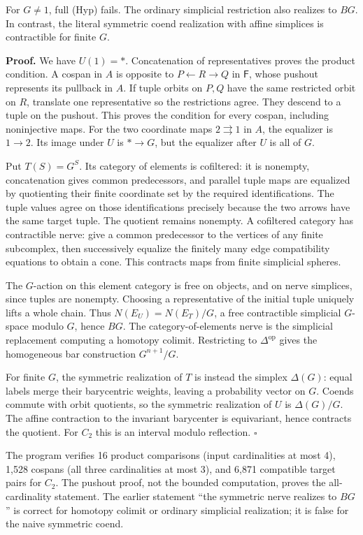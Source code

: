 For \(G\ne1\), full (Hyp) fails. The ordinary simplicial restriction
also realizes to \(BG\). In contrast, the literal symmetric coend
realization with affine simplices is contractible for finite \(G\).

\textbf{Proof.} We have \(U(1)=*\). Concatenation of representatives
proves the product condition. A cospan in \(A\) is opposite to
\(P\leftarrow R\to Q\) in \(\mathsf F\), whose pushout represents its
pullback in \(A\). If tuple orbits on \(P,Q\) have the same restricted
orbit on \(R\), translate one representative so the restrictions agree.
They descend to a tuple on the pushout. This proves the condition for
every cospan, including noninjective maps. For the two coordinate maps
\(2\rightrightarrows1\) in \(A\), the equalizer is \(1\to2\). Its image
under \(U\) is \(*\to G\), but the equalizer after \(U\) is all of
\(G\).

Put \(T(S)=G^S\). Its category of elements is cofiltered: it is
nonempty, concatenation gives common predecessors, and parallel tuple
maps are equalized by quotienting their finite coordinate set by the
required identifications. The tuple values agree on those
identifications precisely because the two arrows have the same target
tuple. The quotient remains nonempty. A cofiltered category has
contractible nerve: give a common predecessor to the vertices of any
finite subcomplex, then successively equalize the finitely many edge
compatibility equations to obtain a cone. This contracts maps from
finite simplicial spheres.

The \(G\)-action on this element category is free on objects, and on
nerve simplices, since tuples are nonempty. Choosing a representative of
the initial tuple uniquely lifts a whole chain. Thus
\(N(E_U)=N(E_T)/G\), a free contractible simplicial \(G\)-space modulo
\(G\), hence \(BG\). The category-of-elements nerve is the simplicial
replacement computing a homotopy colimit. Restricting to
\(\Delta^{\mathrm{op}}\) gives the homogeneous bar construction
\(G^{n+1}/G\).

For finite \(G\), the symmetric realization of \(T\) is instead the
simplex \(\Delta(G)\): equal labels merge their barycentric weights,
leaving a probability vector on \(G\). Coends commute with orbit
quotients, so the symmetric realization of \(U\) is \(\Delta(G)/G\). The
affine contraction to the invariant barycenter is equivariant, hence
contracts the quotient. For \(C_2\) this is an interval modulo
reflection. \(\square\)

The program verifies 16 product comparisons (input cardinalities at most
4), 1,528 cospans (all three cardinalities at most 3), and 6,871
compatible target pairs for \(C_2\). The pushout proof, not the bounded
computation, proves the all-cardinality statement. The earlier statement
``the symmetric nerve realizes to \(BG\)'' is correct for homotopy
colimit or ordinary simplicial realization; it is false for the naive
symmetric coend.

